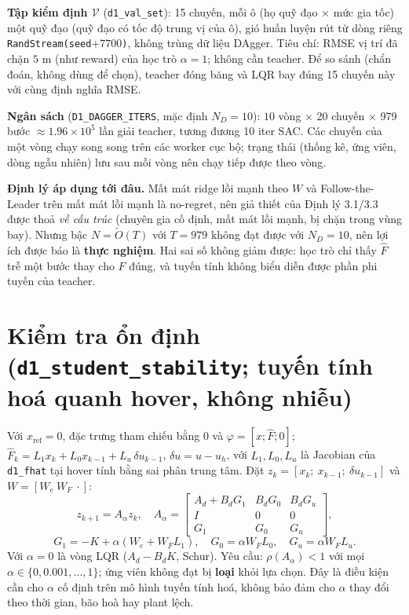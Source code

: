 \documentclass[11pt]{article}
\begin{document}
\textbf{Tập kiểm định $\mathcal V$} (\texttt{d1\_val\_set}): 15 chuyến, mỗi ô (họ quỹ đạo $\times$ mức gia tốc) một quỹ đạo
(quỹ đạo có tốc độ trung vị của ô), gió huấn luyện rút từ dòng riêng \texttt{RandStream(seed}$+7700$\texttt{)}, không trùng
dữ liệu DAgger. Tiêu chí: RMSE vị trí đã chặn $5$ m (như reward) của học trò $\alpha=1$; không cần teacher. Để so sánh
(chẩn đoán, không dùng để chọn), teacher đóng băng và LQR bay đúng 15 chuyến này với cùng định nghĩa RMSE.

\textbf{Ngân sách} (\texttt{D1\_DAGGER\_ITERS}, mặc định $N_D=10$): $10$ vòng $\times$ 20 chuyến $\times$ 979 bước
$\approx1.96\times10^5$ lần giải teacher, tương đương 10 iter SAC. Các chuyến của một vòng chạy song song trên các worker
cục bộ; trạng thái (thống kê, ứng viên, dòng ngẫu nhiên) lưu sau mỗi vòng nên chạy tiếp được theo vòng.

\textbf{Định lý áp dụng tới đâu.} Mất mát ridge lồi mạnh theo $W$ và Follow-the-Leader trên mất mát lồi mạnh là no-regret,
nên giả thiết của Định lý 3.1/3.3 được thoả \emph{về cấu trúc} (chuyên gia cố định, mất mát lồi mạnh, bị chặn trong vùng
bay). Nhưng bậc $N=\tilde O(T)$ với $T=979$ không đạt được với $N_D=10$, nên lợi ích được báo là \textbf{thực nghiệm}.
Hai sai số không giảm được: học trò chỉ thấy $\hat F$ trễ một bước thay cho $F$ đúng, và tuyến tính không biểu diễn được
phần phi tuyến của teacher.

\section{Kiểm tra ổn định (\texttt{d1\_student\_stability}; tuyến tính hoá quanh hover, không nhiễu)}
Với $x_{\mathrm{ref}}=0$, đặc trưng tham chiếu bằng 0 và $\varphi=[x;\hat F;0]$; $\hat F_k=L_1x_k+L_0x_{k-1}+L_u\,\delta u_{k-1}$,
$\delta u=u-u_h$, với $L_1,L_0,L_u$ là Jacobian của \texttt{d1\_fhat} tại hover tính bằng sai phân trung tâm. Đặt
$z_k=[x_k;\ x_{k-1};\ \delta u_{k-1}]$ và $W=[W_e\ W_F\ \cdot]$:
\[
z_{k+1}=A_\alpha z_k,\quad
A_\alpha=\begin{bmatrix}A_d+B_dG_1 & B_dG_0 & B_dG_u\\ I&0&0\\ G_1&G_0&G_u\end{bmatrix},
\]
\[
G_1=-K+\alpha(W_e+W_FL_1),\quad G_0=\alpha W_FL_0,\quad G_u=\alpha W_FL_u .
\]
Với $\alpha=0$ là vòng LQR ($A_d-B_dK$, Schur). Yêu cầu: $\rho(A_\alpha)<1$ với mọi $\alpha\in\{0,0.001,\dots,1\}$; ứng viên
không đạt bị \textbf{loại} khỏi lựa chọn. Đây là điều kiện cần cho $\alpha$ cố định trên mô hình tuyến tính hoá, không bảo
đảm cho $\alpha$ thay đổi theo thời gian, bão hoà hay plant lệch.
\end{document}
